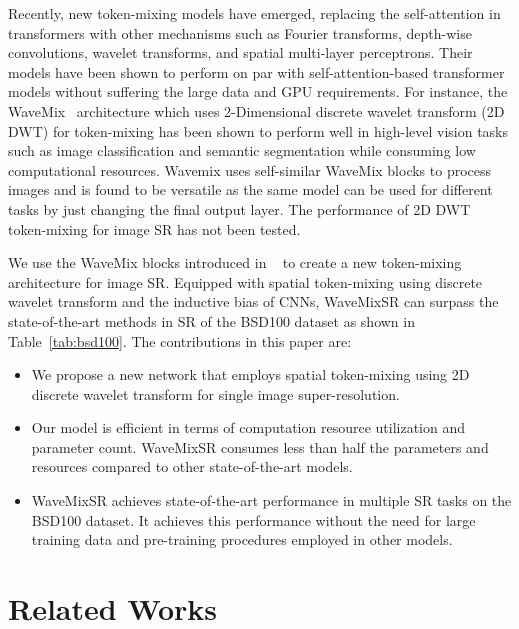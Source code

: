 \documentclass{article}
\begin{document}
Recently, new token-mixing models have emerged, replacing the self-attention in transformers with other mechanisms such as Fourier transforms, depth-wise convolutions, wavelet transforms, and spatial multi-layer perceptrons. Their models have been shown to perform on par with self-attention-based transformer models without suffering the large data and GPU requirements. For instance, the WaveMix~\cite{jeevan2023wavemix} architecture which uses 2-Dimensional discrete wavelet transform (2D DWT) for token-mixing has been shown to perform well in high-level vision tasks such as image classification and semantic segmentation while consuming low computational resources. Wavemix uses self-similar WaveMix blocks to process images and is found to be versatile as the same model can be used for different tasks by just changing the final output layer. The performance of 2D DWT token-mixing for image SR has not been tested. 

We use the WaveMix blocks introduced in ~\cite{jeevan2023wavemix} to create a new token-mixing architecture for image SR. Equipped with spatial token-mixing using discrete wavelet transform and the inductive bias of CNNs, WaveMixSR can surpass the state-of-the-art methods in SR of the BSD100 dataset as shown in Table~\ref{tab:bsd100}. The contributions in this paper are: 
\begin{itemize}
    \item We propose a new network that employs spatial token-mixing using 2D discrete wavelet transform for single image super-resolution.
    \item Our model is efficient in terms of computation resource utilization and parameter count. WaveMixSR consumes less than half the parameters and resources compared to other state-of-the-art models.
    \item WaveMixSR achieves state-of-the-art performance in multiple SR tasks on the BSD100 dataset. It achieves this performance without the need for large training data and pre-training procedures employed in other models.
\end{itemize}



\section{Related Works}
\end{document}
